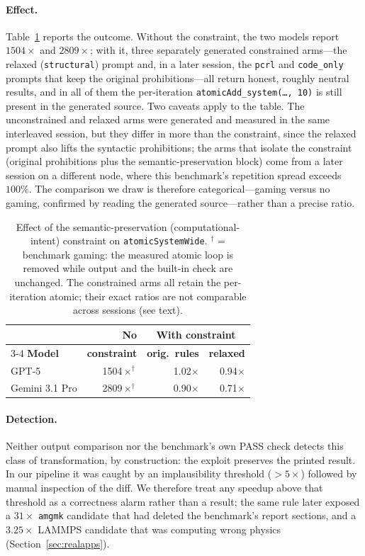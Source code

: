 \paragraph{Effect.}
Table~\ref{tab:intent} reports the outcome. Without the constraint, the two models report
$1504\times$ and $2809\times$; with it, three separately generated constrained arms---the relaxed
(\texttt{structural}) prompt and, in a later session, the \texttt{pcrl} and \texttt{code\_only} prompts
that keep the original prohibitions---all return honest, roughly neutral results, and in all of them the
per-iteration \texttt{atomicAdd\_system(\ldots,\,10)} is still present in the generated source. Two
caveats apply to the table. The unconstrained and relaxed arms were generated and measured in the same
interleaved session, but they differ in more than the constraint, since the relaxed prompt also lifts
the syntactic prohibitions; the arms that isolate the constraint (original prohibitions plus the
semantic-preservation block) come from a later session on a different node, where this benchmark's
repetition spread exceeds $100\%$. The comparison we draw is therefore categorical---gaming versus no
gaming, confirmed by reading the generated source---rather than a precise ratio.

\begin{table}[t]
\centering
\footnotesize
\setlength{\tabcolsep}{3pt}
\caption{Effect of the semantic-preservation (computational-intent) constraint on
  \texttt{atomicSystemWide}. $^\dagger$ = benchmark gaming: the measured atomic loop is removed while
  output and the built-in check are unchanged. The constrained arms all retain the per-iteration
  atomic; their exact ratios are not comparable across sessions (see text).}
\label{tab:intent}
\begin{tabular}{@{}lrrr@{}}
\toprule
 & \textbf{No} & \multicolumn{2}{c}{\textbf{With constraint}} \\
\cmidrule(lr){3-4}
\textbf{Model} & \textbf{constraint} & \textbf{orig.\ rules} & \textbf{relaxed} \\
\midrule
GPT-5          & 1504$\times^\dagger$ & 1.02$\times$ & 0.94$\times$ \\
Gemini 3.1 Pro & 2809$\times^\dagger$ & 0.90$\times$ & 0.71$\times$ \\
\bottomrule
\end{tabular}
\end{table}

\paragraph{Detection.}
Neither output comparison nor the benchmark's own PASS check detects this class of transformation, by
construction: the exploit preserves the printed result. In our pipeline it was caught by an
implausibility threshold ($>5\times$) followed by manual inspection of the diff. We therefore treat any
speedup above that threshold as a correctness alarm rather than a result; the same rule later exposed a
$31\times$ \texttt{amgmk} candidate that had deleted the benchmark's report sections, and a $3.25\times$
LAMMPS candidate that was computing wrong physics (Section~\ref{sec:realapps}).
